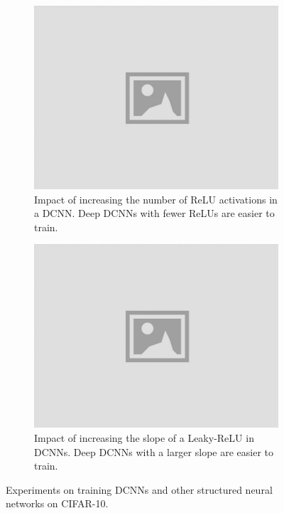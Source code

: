 \begin{figure}
   \centering
   \begin{subfigure}[b]{0.49\textwidth}
       \centering
       \includegraphics[width=\textwidth]{graphs/cifar10_factor.jpg}
       \caption{
	Impact of increasing the number of ReLU activations in a DCNN.
	Deep DCNNs with fewer ReLUs are easier to train.}
       \label{figure:cifar10_factor}
   \end{subfigure}
   \hfill
   \begin{subfigure}[b]{0.49\textwidth}
       \centering
       \includegraphics[width=\textwidth]{graphs/cifar10_leaky_relu.jpg}
       \caption{
        Impact of increasing the slope of a Leaky-ReLU in DCNNs.
        Deep DCNNs with a larger slope are easier to train.}
       \label{figure:cifar10_leaky_relu}
   \end{subfigure}
   \caption{Experiments on training DCNNs and other structured neural networks on CIFAR-10.}
\end{figure}


